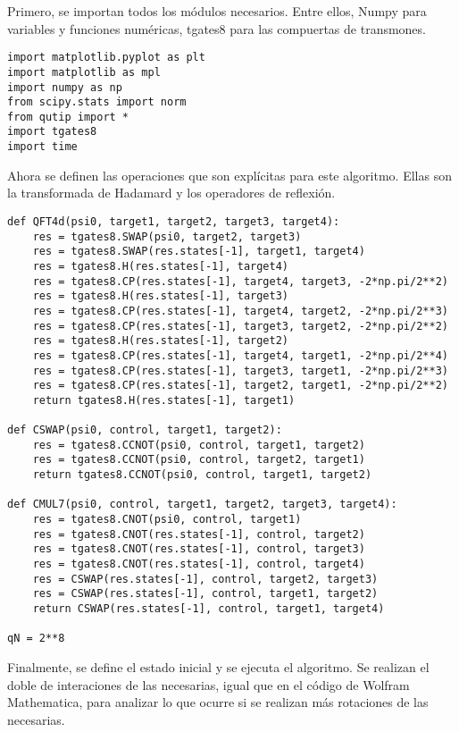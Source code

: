 Primero, se importan todos los módulos necesarios. Entre ellos, Numpy para variables y funciones numéricas, tgates8 para las compuertas de transmones.

\begin{verbatim}
import matplotlib.pyplot as plt
import matplotlib as mpl
import numpy as np
from scipy.stats import norm
from qutip import *
import tgates8
import time
\end{verbatim}

Ahora se definen las operaciones que son explícitas para este algoritmo. Ellas son la transformada de Hadamard y los operadores de reflexión.

\begin{verbatim}
def QFT4d(psi0, target1, target2, target3, target4):
    res = tgates8.SWAP(psi0, target2, target3)
    res = tgates8.SWAP(res.states[-1], target1, target4)
    res = tgates8.H(res.states[-1], target4)
    res = tgates8.CP(res.states[-1], target4, target3, -2*np.pi/2**2)
    res = tgates8.H(res.states[-1], target3)
    res = tgates8.CP(res.states[-1], target4, target2, -2*np.pi/2**3)
    res = tgates8.CP(res.states[-1], target3, target2, -2*np.pi/2**2)
    res = tgates8.H(res.states[-1], target2)
    res = tgates8.CP(res.states[-1], target4, target1, -2*np.pi/2**4)
    res = tgates8.CP(res.states[-1], target3, target1, -2*np.pi/2**3)
    res = tgates8.CP(res.states[-1], target2, target1, -2*np.pi/2**2)
    return tgates8.H(res.states[-1], target1)

def CSWAP(psi0, control, target1, target2):
    res = tgates8.CCNOT(psi0, control, target1, target2)
    res = tgates8.CCNOT(psi0, control, target2, target1)
    return tgates8.CCNOT(psi0, control, target1, target2)

def CMUL7(psi0, control, target1, target2, target3, target4):
    res = tgates8.CNOT(psi0, control, target1)
    res = tgates8.CNOT(res.states[-1], control, target2)
    res = tgates8.CNOT(res.states[-1], control, target3)
    res = tgates8.CNOT(res.states[-1], control, target4)
    res = CSWAP(res.states[-1], control, target2, target3)
    res = CSWAP(res.states[-1], control, target1, target2)
    return CSWAP(res.states[-1], control, target1, target4)

qN = 2**8
\end{verbatim}

Finalmente, se define el estado inicial y se ejecuta el algoritmo. Se realizan el doble de interaciones de las necesarias, igual que en el código de Wolfram Mathematica, para analizar lo que ocurre si se realizan más rotaciones de las necesarias.

